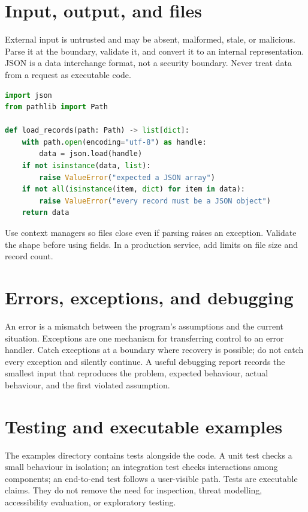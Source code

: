 \section{Input, output, and files}
External input is untrusted and may be absent, malformed, stale, or malicious. Parse it at the boundary, validate it, and convert it to an internal representation. JSON is a data interchange format, not a security boundary. Never treat data from a request as executable code.

\begin{lstlisting}[language=Python,caption={Safe JSON loading at a file boundary.}]
import json
from pathlib import Path

def load_records(path: Path) -> list[dict]:
    with path.open(encoding="utf-8") as handle:
        data = json.load(handle)
    if not isinstance(data, list):
        raise ValueError("expected a JSON array")
    if not all(isinstance(item, dict) for item in data):
        raise ValueError("every record must be a JSON object")
    return data
\end{lstlisting}

Use context managers so files close even if parsing raises an exception. Validate the shape before using fields. In a production service, add limits on file size and record count.

\section{Errors, exceptions, and debugging}
An error is a mismatch between the program's assumptions and the current situation. Exceptions are one mechanism for transferring control to an error handler. Catch exceptions at a boundary where recovery is possible; do not catch every exception and silently continue. A useful debugging report records the smallest input that reproduces the problem, expected behaviour, actual behaviour, and the first violated assumption.

\section{Testing and executable examples}
The examples directory contains tests alongside the code. A unit test checks a small behaviour in isolation; an integration test checks interactions among components; an end-to-end test follows a user-visible path. Tests are executable claims. They do not remove the need for inspection, threat modelling, accessibility evaluation, or exploratory testing.

